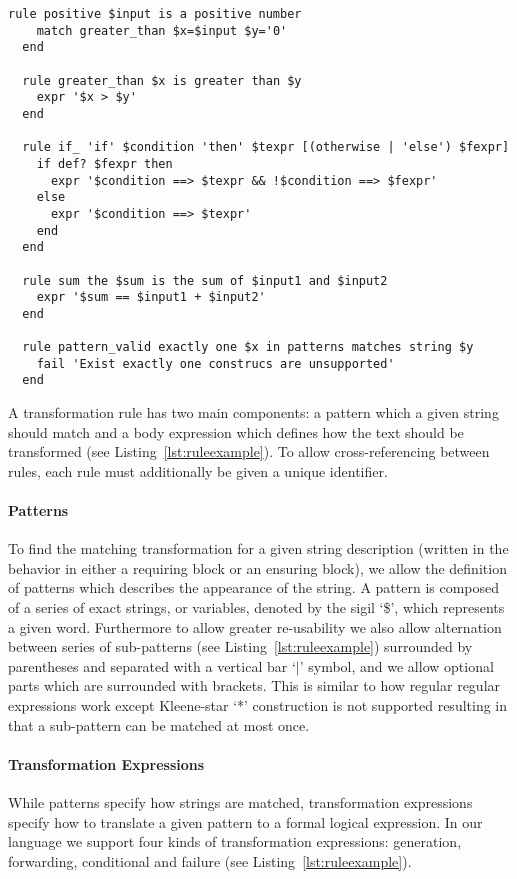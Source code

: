 \begin{lstlisting}[caption={Different Types of Transformation Rules in Lettuce},label={lst:ruleexample}]
  rule positive $input is a positive number
    match greater_than $x=$input $y='0'
  end

  rule greater_than $x is greater than $y
    expr '$x > $y'
  end

  rule if_ 'if' $condition 'then' $texpr [(otherwise | 'else') $fexpr]
    if def? $fexpr then
      expr '$condition ==> $texpr && !$condition ==> $fexpr'
    else
      expr '$condition ==> $texpr'
    end
  end

  rule sum the $sum is the sum of $input1 and $input2
    expr '$sum == $input1 + $input2'
  end

  rule pattern_valid exactly one $x in patterns matches string $y
    fail 'Exist exactly one construcs are unsupported'
  end
\end{lstlisting}

A transformation rule has two main components: a pattern which a given
string should match and a body expression which defines how the
text should be transformed (see Listing~\ref{lst:ruleexample}).
To allow cross-referencing between rules, each rule must additionally be
given a unique identifier.

\paragraph{Patterns}
\label{par:Patterns}

To find the matching transformation for a given string description
(written in the behavior in either a requiring block or an ensuring block), we allow the
definition of patterns which describes the appearance of the string.
A pattern is composed of a series of exact strings, or variables,
denoted by the sigil `\$', which represents a given word.
Furthermore to allow greater re-usability we also allow alternation between
series of sub-patterns (see Listing~\ref{lst:ruleexample}) surrounded by parentheses and
separated with a vertical bar `$\vert$' symbol, and we allow optional parts which are
surrounded with brackets.  This is similar to how regular regular
expressions work except Kleene-star `*' construction is not supported
resulting in that a sub-pattern can be matched at most once.

\paragraph{Transformation Expressions}
\label{par:Transformation Expressions}
While patterns specify how strings are matched, transformation expressions
specify how to translate a given pattern to a formal logical expression.
In our language we support four kinds of transformation expressions:
generation, forwarding, conditional and failure (see Listing~\ref{lst:ruleexample}).

